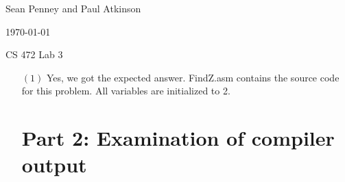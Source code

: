 \documentclass[letterpaper,10pt,titlepage]{article}
\def\name{Sean Penney and Paul Atkinson}
\begin{document}
\hfill \name

\hfill \today

\hfill CS 472 Lab 3

\begin{enumerate}

\section*{Part 1: Problem Set 5}
\item[$(1)$] Yes, we got the expected answer.  FindZ.asm contains the source code for this problem.  All variables are initialized to 2.


\section*{Part 2: Examination of compiler output}


  
\end{enumerate}
\end{document}
